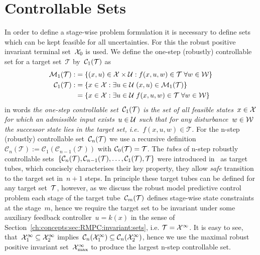 \section{Controllable Sets}\label{ch:concepts:sec:RMPC:controllable:sets}
\resetforsection
%
%
In order to define a stage-wise problem formulation it is necessary to define sets which can be kept feasible for all uncertainties.
%
For this the robust positive invariant terminal set~$\mathcal X_0$ is used.
%
We define the one-step (robustly) controllable set for a target set~$\mathcal T$ by~$\mathcal C_1(\mathcal T)$ as~
%
\begin{equation}\label{eq:RMPC:target:tubes}
	\begin{aligned}
	\mathcal M_1(\mathcal T) :&= \{(x,u)\in\mathcal X\times\mathcal U: f(x,u,w)\in\mathcal T\;\forall w\in\mathcal W\}\\
	\mathcal C_1(\mathcal T) :&= \{x\in\mathcal X:\exists u\in\mathcal U\; (x,u)\in\mathcal M_1(\mathcal T)\}\\
	&=\{x\in\mathcal X: \exists u\in\mathcal U\; f(x,u,w)\in\mathcal T\;\forall w\in\mathcal W\}
	\end{aligned}
\end{equation}
%
in words \emph{the one-step controllable set~$\mathcal C_1(\mathcal T)$ is the set of all feasible states~$x\in\mathcal X$ for which an admissible input exists~$u\in\mathcal U$ such that for any disturbance~$w\in\mathcal W$ the successor state lies in the target set, i.e.~$f(x,u,w)\in\mathcal T$.}
%
For the n-step (robustly) controllable set~$\mathcal C_n(\mathcal T)$ we use a recursive definition~$\mathcal C_n(\mathcal T) := \mathcal C_1(\mathcal C_{n-1}(\mathcal T))$ with $\mathcal C_0(\mathcal T)=\mathcal T$.
%
The \emph{tubes} of n-step robustly controllable sets~$\{\mathcal C_n(\mathcal T),\mathcal C_{n-1}(\mathcal T),\dots,\mathcal C_1(\mathcal T),\mathcal T\}$ were introduced in~\cite{Bertsekas:1971} as target tubes, which concisely characterises their key property, they allow \emph{safe} transition to the target set in~$n+1$ steps.
%
In principle these target tubes can be defined for any target set~$\mathcal T$, however, as we discuss the robust model predictive control problem each stage of the target tube~$\mathcal C_m(\mathcal T)$ defines stage-wise state constraints at the stage~$m$, hence we require the target set to be invariant under some auxiliary feedback controller~$u=k(x)$ in the sense of Section~\ref{ch:concepts:sec:RMPC:invariant:sets}, i.e. $\mathcal T=\mathcal X^\infty$. 
%
It is easy to see, that~$\mathcal X_1^\infty\subseteq\mathcal X_2^\infty$ implies~$\mathcal C_n(\mathcal X_1^\infty)\subseteq\mathcal C_n(\mathcal X_2^\infty)$, hence we use the maximal robust positive invariant set~$\mathcal X^\infty_{\max}$ to produce the largest n-step controllable set.
